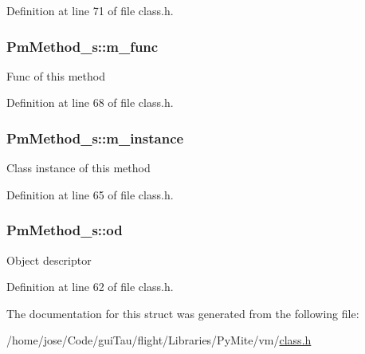 Definition at line 71 of file class.\-h.

\hypertarget{struct_pm_method__s_a042fd475b7fb3eaffa623117e8445a0f}{
\subsubsection[{m\-\_\-func}]{ Pm\-Method\-\_\-s\-::m\-\_\-func}}\label{struct_pm_method__s_a042fd475b7fb3eaffa623117e8445a0f}
Func of this method 

Definition at line 68 of file class.\-h.

\hypertarget{struct_pm_method__s_a004b17bf125083834d353bbf15938281}{
\subsubsection[{m\-\_\-instance}]{ Pm\-Method\-\_\-s\-::m\-\_\-instance}}\label{struct_pm_method__s_a004b17bf125083834d353bbf15938281}
Class instance of this method 

Definition at line 65 of file class.\-h.

\hypertarget{struct_pm_method__s_a5ae85884d117be98f6d91d3685f1b2ac}{
\subsubsection[{od}]{ Pm\-Method\-\_\-s\-::od}}\label{struct_pm_method__s_a5ae85884d117be98f6d91d3685f1b2ac}
Object descriptor 

Definition at line 62 of file class.\-h.



The documentation for this struct was generated from the following file\-:\begin{DoxyCompactItemize}
\item 
/home/jose/\-Code/gui\-Tau/flight/\-Libraries/\-Py\-Mite/vm/\hyperlink{class_8h}{class.\-h}\end{DoxyCompactItemize}
